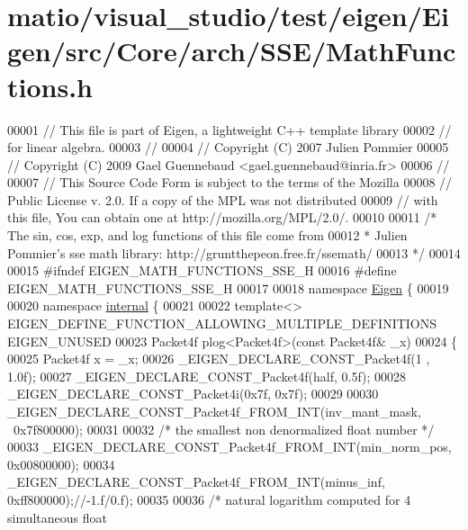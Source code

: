 \hypertarget{matio_2visual__studio_2test_2eigen_2_eigen_2src_2_core_2arch_2_s_s_e_2_math_functions_8h_source}{}\section{matio/visual\+\_\+studio/test/eigen/\+Eigen/src/\+Core/arch/\+S\+S\+E/\+Math\+Functions.h}
\label{matio_2visual__studio_2test_2eigen_2_eigen_2src_2_core_2arch_2_s_s_e_2_math_functions_8h_source}

\begin{DoxyCode}
00001 \textcolor{comment}{// This file is part of Eigen, a lightweight C++ template library}
00002 \textcolor{comment}{// for linear algebra.}
00003 \textcolor{comment}{//}
00004 \textcolor{comment}{// Copyright (C) 2007 Julien Pommier}
00005 \textcolor{comment}{// Copyright (C) 2009 Gael Guennebaud <gael.guennebaud@inria.fr>}
00006 \textcolor{comment}{//}
00007 \textcolor{comment}{// This Source Code Form is subject to the terms of the Mozilla}
00008 \textcolor{comment}{// Public License v. 2.0. If a copy of the MPL was not distributed}
00009 \textcolor{comment}{// with this file, You can obtain one at http://mozilla.org/MPL/2.0/.}
00010 
00011 \textcolor{comment}{/* The sin, cos, exp, and log functions of this file come from}
00012 \textcolor{comment}{ * Julien Pommier's sse math library: http://gruntthepeon.free.fr/ssemath/}
00013 \textcolor{comment}{ */}
00014 
00015 \textcolor{preprocessor}{#ifndef EIGEN\_MATH\_FUNCTIONS\_SSE\_H}
00016 \textcolor{preprocessor}{#define EIGEN\_MATH\_FUNCTIONS\_SSE\_H}
00017 
00018 \textcolor{keyword}{namespace }\hyperlink{namespace_eigen}{Eigen} \{
00019 
00020 \textcolor{keyword}{namespace }\hyperlink{namespaceinternal}{internal} \{
00021 
00022 \textcolor{keyword}{template}<> EIGEN\_DEFINE\_FUNCTION\_ALLOWING\_MULTIPLE\_DEFINITIONS EIGEN\_UNUSED
00023 Packet4f plog<Packet4f>(\textcolor{keyword}{const} Packet4f& \_x)
00024 \{
00025   Packet4f x = \_x;
00026   \_EIGEN\_DECLARE\_CONST\_Packet4f(1 , 1.0f);
00027   \_EIGEN\_DECLARE\_CONST\_Packet4f(half, 0.5f);
00028   \_EIGEN\_DECLARE\_CONST\_Packet4i(0x7f, 0x7f);
00029 
00030   \_EIGEN\_DECLARE\_CONST\_Packet4f\_FROM\_INT(inv\_mant\_mask, ~0x7f800000);
00031 
00032   \textcolor{comment}{/* the smallest non denormalized float number */}
00033   \_EIGEN\_DECLARE\_CONST\_Packet4f\_FROM\_INT(min\_norm\_pos,  0x00800000);
00034   \_EIGEN\_DECLARE\_CONST\_Packet4f\_FROM\_INT(minus\_inf,     0xff800000);\textcolor{comment}{//-1.f/0.f);}
00035 
00036   \textcolor{comment}{/* natural logarithm computed for 4 simultaneous float}

\end{DoxyCode}
